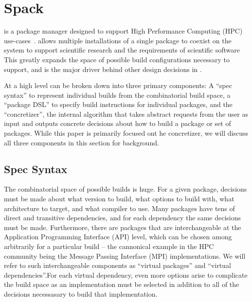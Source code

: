 \section{Spack}
\label{sec:software-model}

\spack{} is a package manager designed to support High Performance Computing (HPC) use-cases~\cite{gamblin+:sc15}.
\spack{} allows multiple installations of a single package to coexist on the system to support scientific research and the requirements of scientific software This greatly expands the space of possible build configurations necessary to support, and is the major driver behind other design decisions in \spack{}.

At a high level \spack{} can be broken down into three primary components: A ``spec syntax'' to represent individual builds from the combinatorial build space, a ``package DSL'' to specify build instructions for individual packages, and the ``concretizer'', the internal algorithm that takes abstract requests from the user as input and outputs concrete decisions about how to build a package or set of packages. While this paper is primarily focused ont he concretizer, we will discuss all three components in this section for background.

\subsection{Spec Syntax}

The combinatorial space of possible \spack{} builds is huge. For a given package, decisions must be made about what version to build, what options to build with, what architecture to target, and what compiler to use. Many packages have tens of direct and transitive dependencies, and for each dependency the same decisions must be made. Furthermore, there are packages that are interchangeable at the Application Programming Interface (API) level, which can be chosen among arbitrarily for a particular build -- the cannonical example in the HPC community being the Message Passing Interface (MPI) implementations. We will refer to such interchangeable components as ``virtual packages'' and ``virtual dependencies''.For each virtual dependency, even more options arise to complicate the build space as an implementation must be selected in addition to all of the decisions necessasary to build that implementation.

